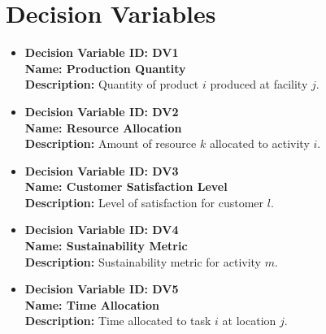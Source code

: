 \documentclass{article}
\begin{document}
\section{Decision Variables}
\begin{itemize}
    \item \textbf{Decision Variable ID: DV1} \\
          \textbf{Name: Production Quantity} \\
          \textbf{Description:} Quantity of product $i$ produced at facility $j$.

    \item \textbf{Decision Variable ID: DV2} \\
          \textbf{Name: Resource Allocation} \\
          \textbf{Description:} Amount of resource $k$ allocated to activity $i$.

    \item \textbf{Decision Variable ID: DV3} \\
          \textbf{Name: Customer Satisfaction Level} \\
          \textbf{Description:} Level of satisfaction for customer $l$.

    \item \textbf{Decision Variable ID: DV4} \\
          \textbf{Name: Sustainability Metric} \\
          \textbf{Description:} Sustainability metric for activity $m$.

    \item \textbf{Decision Variable ID: DV5} \\
          \textbf{Name: Time Allocation} \\
          \textbf{Description:} Time allocated to task $i$ at location $j$.
\end{itemize}
\end{document}
